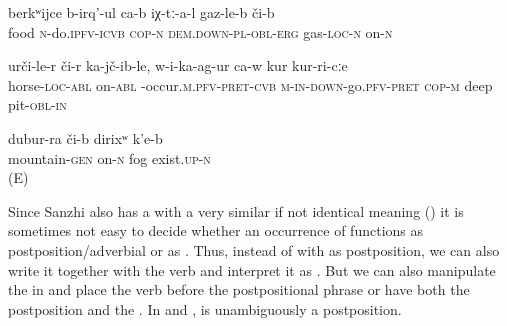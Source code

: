 \begin{exe}
	\ex
	\begin{xlist}
		\ex	\label{They are making food on a gas cooker}
		\gll	berkʷijce	b-irq'-ul	ca-b	iχ-tː-a-l	gaz-le-b	či-b  \\
			food	\textsc{n}-do.\textsc{ipfv}-\textsc{icvb} \textsc{cop}-\textsc{n}	\textsc{dem.down}-\textsc{pl}-\textsc{obl}-\textsc{erg}		gas-\textsc{loc}-\textsc{n}	on-\textsc{n}\\
		\glt	{}

		\ex	\label{He fell down from the horse into a deep pit}
		\gll	urči-le-r	či-r	ka-jč-ib-le,	w-i-ka-ag-ur	ca-w	kur	kur-ri-cːe   \\
			horse-\textsc{loc}-\textsc{abl}	on-\textsc{abl}	-occur.\textsc{m}.\textsc{pfv}-\textsc{pret}-\textsc{cvb}	\textsc{m-in-down}-go.\textsc{pfv}-\textsc{pret}	\textsc{cop-m}	deep	pit-\textsc{obl}-\textsc{in}\\
		\glt	{}

		\ex	\label{There is fog on / above the mountain}
		\gll	dubur-ra	či-b	dirixʷ	k'e-b\\
			mountain-\textsc{gen}	on-\textsc{n}	fog	exist.\textsc{up-n}\\
		\glt	{} (E)
	\end{xlist}
\end{exe}

Since Sanzhi also has a   with a very similar if not identical meaning () it is sometimes not easy to decide whether an occurrence of  functions as postposition\slash adverbial or as . Thus, instead of  with  as postposition, we can also write it together with the verb and interpret it as  .  But we can also manipulate the  in  and place the verb before the postpositional phrase  or have both the postposition and the  . In  and ,  is unambiguously a postposition.

